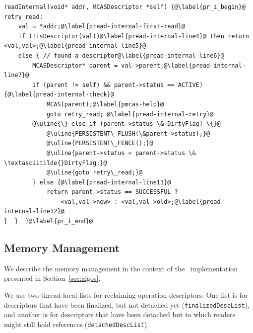 \begin{lstlisting}[caption={[The \readInternal\ auxiliary function, used by our \mcas{} algorithm for persistent memory.]The \readInternal\ auxiliary function, used by our \mcas{} algorithm for persistent memory. \uline{Underlined} commands are related to persistence.},label=list:readInternal-persistent,keywords={},firstnumber=last]
readInternal(void* addr, MCASDescriptor *self) {@\label{pr_i_begin}@
retry_read:                            
    val = *addr;@\label{pread-internal-first-read}@
    if (!isDescriptor(val))@\label{pread-internal-line4}@ then return <val,val>;@\label{pread-internal-line5}@
    else { // found a descriptor@\label{pread-internal-line6}@
        MCASDescriptor* parent = val->parent;@\label{pread-internal-line7}@
        if (parent != self) && parent->status == ACTIVE) {@\label{pread-internal-check}@
            MCAS(parent);@\label{pmcas-help}@
            goto retry_read; @\label{pread-internal-retry}@
        @\uline{\} else if (parent->status \& DirtyFlag) \{}@
            @\uline{PERSISTENT\_FLUSH(\&parent->status);}@
            @\uline{PERSISTENT\_FENCE();}@
            @\uline{parent->status = parent->status \& \textasciitilde{}DirtyFlag;}@
            @\uline{goto retry\_read;}@
        } else {@\label{pread-internal-line11}@
            return parent->status == SUCCESSFUL ?
                <val,val->new> : <val,val->old>;@\label{pread-internal-line12}@
}  }  }@\label{pr_i_end}@
\end{lstlisting}

\subsection{Memory Management}
\label{sec:mem-mgt-app}
We describe the memory management in the context of the \mcas\ implementation presented in Section~\ref{sec:algos}.

We use two thread-local lists for reclaiming operation descriptors:
One list is for descriptors that have been finalized, but not detached yet (\texttt{finalizedDescList}), and another is for
descriptors that have been detached but to which readers might still hold references (\texttt{detachedDescList}).

